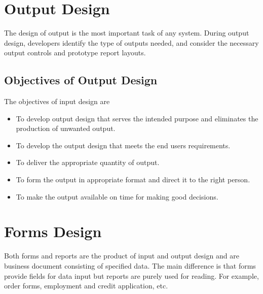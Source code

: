 \documentclass[a4paper,12pt]{book}
\begin{document}
	
	
\section{Output Design}
	The design of output is the most important task of any system. During output design, developers identify the type of outputs needed, and consider the necessary output controls and prototype report layouts.
	
	
	\subsection{Objectives of Output Design}
	The objectives of input design are 
\begin{itemize}
	\item 	To develop output design that serves the intended purpose and eliminates the production of unwanted output.
	\item 	To develop the output design that meets the end users requirements.
	\item 	To deliver the appropriate quantity of output.
	\item 	To form the output in appropriate format and direct it to the right person.
	\item 	To make the output available on time for making good decisions.
\end{itemize}	
	\section{Forms Design}
	Both forms and reports are the product of input and output design and are business document consisting of specified data. The main difference is that forms provide fields for data input but reports are purely used for reading. For example, order forms, employment and credit application, etc.
\end{document}

